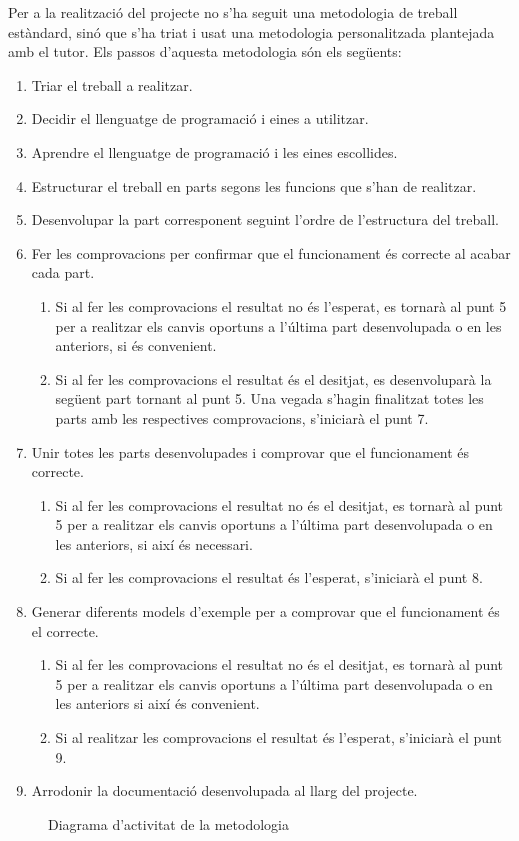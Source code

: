 Per a la realització del projecte no s’ha seguit una metodologia de treball
estàndard, sinó que s’ha triat i usat una metodologia personalitzada plantejada
amb el tutor. Els passos d’aquesta metodologia són els següents:
\begin{enumerate}
  \item Triar el treball a realitzar.
  \item Decidir el llenguatge de programació i eines a utilitzar.
  \item Aprendre el llenguatge de programació i les eines escollides.
  \item Estructurar el treball en parts segons les funcions que s'han de realitzar.
  \item Desenvolupar la part corresponent seguint l'ordre de l'estructura del treball.
  \item Fer les comprovacions per confirmar que el funcionament és correcte al acabar cada part.
  \begin{enumerate}
    \item Si al fer les comprovacions el resultat no és l'esperat, es tornarà al punt 5 per a realitzar els canvis oportuns a l'última part desenvolupada o en les anteriors, si és convenient.
    \item Si al fer les comprovacions el resultat és el desitjat, es desenvoluparà la següent part tornant al punt 5. Una vegada s'hagin finalitzat totes les parts amb les respectives comprovacions, s'iniciarà el punt 7.
  \end{enumerate}
  \item Unir totes les parts desenvolupades i comprovar que el funcionament és correcte.
  \begin{enumerate}
    \item Si al fer les comprovacions el resultat no és el desitjat, es tornarà al punt 5 per a realitzar els canvis oportuns a l'última part desenvolupada o en les anteriors, si així és necessari.
    \item Si al fer les comprovacions el resultat és l'esperat, s'iniciarà el punt 8.
  \end{enumerate}
  \item Generar diferents models d'exemple per a comprovar que el funcionament és el correcte.
  \begin{enumerate}
    \item Si al fer les comprovacions el resultat no és el desitjat, es tornarà al punt 5 per a realitzar els canvis oportuns a l'última part desenvolupada o en les anteriors si així és convenient.
    \item Si al realitzar les comprovacions el resultat és l'esperat, s'iniciarà el punt 9.
  \end{enumerate}
  \item Arrodonir la documentació desenvolupada al llarg del projecte.
\end{enumerate}
\begin{figure}[htbp]
  \centering
  
  \caption{Diagrama d'activitat de la metodologia}
\end{figure}
